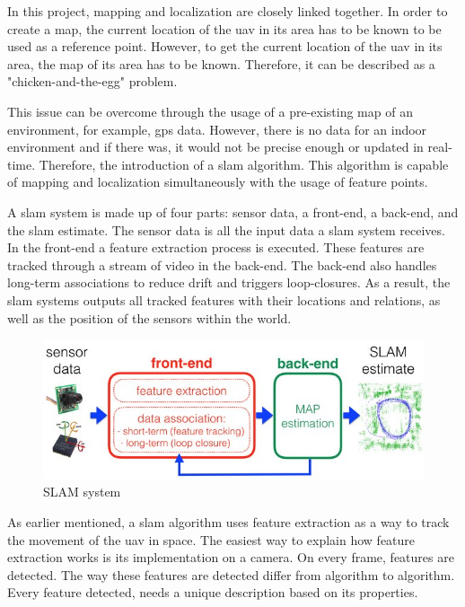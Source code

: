 In this project, mapping and localization are closely linked together. In order to create a map, the current location of the \acs{uav} in its area has to be known to be used as a reference point. However, to get the current location of the \acs{uav} in its area, the map of its area has to be known. Therefore, it can be described as a "chicken\hyp{}and\hyp{}the\hyp{}egg" problem.

This issue can be overcome through the usage of a pre-existing map of an environment, for example, \acs{gps} data. However, there is no data for an indoor environment and if there was, it would not be precise enough or updated in real\hyp{}time. Therefore, the introduction of a \acs{slam} algorithm. This algorithm is capable of mapping and localization simultaneously with the usage of feature points.

A \acs{slam} system is made up of four parts: sensor data, a front\hyp{}end, a back\hyp{}end, and the \acs{slam} estimate. The sensor data is all the input data a \acs{slam} system receives. In the front\hyp{}end a feature extraction process is executed. These features are tracked through a stream of video in the back\hyp{}end. The back\hyp{}end also handles long\hyp{}term associations to reduce drift and triggers loop\hyp{}closures. As a result, the \acs{slam} systems outputs all tracked features with their locations and relations, as well as the position of the sensors within the world.

\begin{figure}[!h]
  \centering
  \includegraphics[width=0.75\linewidth]{images/slam_system.jpg}
  \caption{SLAM system}
  \label{fig:slam_system}
\end{figure}

As earlier mentioned, a \acs{slam} algorithm uses feature extraction as a way to track the movement of the \acs{uav} in space. The easiest way to explain how feature extraction works is its implementation on a camera. On every frame, features are detected. The way these features are detected differ from algorithm to algorithm. Every feature detected, needs a unique description based on its properties. 

